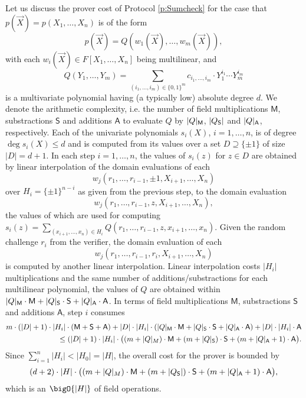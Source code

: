 \documentclass[11pt]{article}
\theoremstyle{definition}
\theoremstyle{remark}
\newtheorem{rem}[thm]{Remark}
\begin{document}
Let us discuss the prover cost of Protocol \ref{p:Sumcheck} for the case that  $p(\vec X) = p(X_1,\ldots, X_n)$ is of the form
\[
p(\vec X) = Q(w_1(\vec X), \ldots, w_m(\vec X)),
\]
with each $w_i(\vec X)\in F[X_1,\ldots, X_n]$ being multilinear, and 
\[
Q(Y_1,\ldots, Y_m) = \sum_{(i_1,\ldots, i_m)\in \{0,1\}^m} c_{i_1,\ldots, i_m} \cdot Y_1^{i_1}\cdots Y_m^{i_m}
\]
 is a multivariate polynomial having (a typically low) absolute degree $d$.
We denote the arithmetic complexity, i.e. the number of field multiplications $\mathsf M$, substractions $\mathsf S$ and additions $\mathsf A$ to evaluate $Q$ by $|Q|_\textsf M$, $|Q_\textsf S|$ and $|Q|_\textsf A$, respectively.
Each of the univariate polynomials $s_i(X)$, $i=1,\ldots, n$, is of degree $\deg s_i(X) \leq d$ and is computed from its values over a set $D \supseteq \{\pm 1\}$ of  size $|D| = d + 1$.
In each step $i=1,\ldots, n$, the values of $s_i(z)$ for $z\in D$ are obtained by linear interpolation of the domain evaluations of each
\[
w_j (r_1,\ldots, r_{i-1}, \pm 1, X_{i+1}, \ldots, X_n)
\]
over $H_{i}=\{\pm 1\}^{n-i}$ as given from the previous step, to the domain evaluation
\[
w_j (r_1,\ldots, r_{i-1}, z, X_{i+1}, \ldots, X_n), 
\]
the values of which are used for computing $s_i(z) = \sum_{(x_{i+1},\ldots, x_n)\in H_{i}} Q(r_1,\ldots, r_{i-1}, z, x_{i+1}, \ldots, x_n)$.
Given the random challenge $r_i$ from the verifier, the domain evaluation of each   
\[
w_j(r_1,\ldots, r_{i-1}, r_i, X_{i+1},\ldots, X_n)
\]
is computed by another linear interpolation.
Linear interpolation costs $|H_{i}|$ multiplications and the same number of additions/substractions for each multilinear polynomial, the values of $Q$ are obtained within $|Q|_\textsf M \cdot \textsf{M} +   |Q|_\textsf S \cdot \textsf S + |Q|_\textsf A \cdot \textsf A$.  
In terms of field multiplications $\mathsf M$, substractions $\mathsf S$ and additions $\mathsf A$, step $i$ consumes 
\begin{align*}
m \cdot (|D| + 1)\cdot |H_{i}| \cdot (\textsf M + \textsf S + \textsf A)
+  |D|\cdot |H_{i}| \cdot ( |Q|_\textsf M \cdot \textsf{M} +   |Q|_\textsf S \cdot \textsf S + |Q|_\textsf A \cdot \textsf A) 
+ |D|\cdot |H_{i}| \cdot \textsf A
\\
\leq (|D| + 1)\cdot |H_{i}| \cdot \big((m + |Q|_M)\cdot\textsf M +  (m+ |Q|_\textsf S) \cdot\textsf S + (m + |Q|_\textsf A + 1)\cdot \textsf A\big).
\end{align*}
Since $\sum_{i=1}^{n} |H_{i}| < |H_0| = |H|$, the overall cost for the prover is bounded by
\begin{align}
\label{e:SumcheckCost}
(d + 2)\cdot |H| \cdot \big((m + |Q|_M)\cdot\textsf M +  (m + |Q_\textsf S|) \cdot\textsf S + (m + |Q|_\textsf A + 1)\cdot \textsf A\big),
\end{align}
which is an $\bigO{|H|}$ of field operations.
\end{document}
